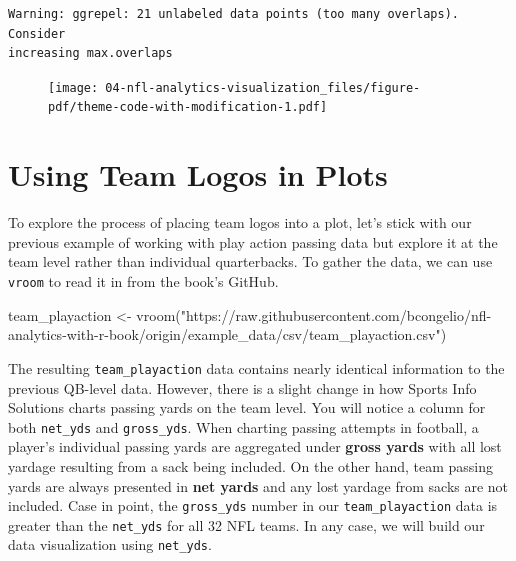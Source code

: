 \documentclass[
  letterpaper,
]{krantz}
\newenvironment{Shaded}{\begin{snugshade}}{\end{snugshade}}
\newcommand{\FunctionTok}[1]{\textcolor[rgb]{0.28,0.35,0.67}{#1}}
\newcommand{\NormalTok}[1]{\textcolor[rgb]{0.00,0.23,0.31}{#1}}
\newcommand{\OtherTok}[1]{\textcolor[rgb]{0.00,0.23,0.31}{#1}}
\newcommand{\StringTok}[1]{\textcolor[rgb]{0.13,0.47,0.30}{#1}}
\begin{document}
\begin{verbatim}
Warning: ggrepel: 21 unlabeled data points (too many overlaps). Consider
increasing max.overlaps
\end{verbatim}

\begin{figure}[H]

{\centering \texttt{[image: 04-nfl-analytics-visualization\_files/figure-pdf/theme-code-with-modification-1.pdf]}

}

\end{figure}

\hypertarget{using-team-logos-in-plots}{%
\section{Using Team Logos in Plots}\label{using-team-logos-in-plots}}

To explore the process of placing team logos into a plot, let's stick
with our previous example of working with play action passing data but
explore it at the team level rather than individual quarterbacks. To
gather the data, we can use \texttt{vroom} to read it in from the book's
GitHub.

\begin{Shaded}
\begin{Highlighting}[]
\NormalTok{team\_playaction }\OtherTok{\textless{}{-}}
  \FunctionTok{vroom}\NormalTok{(}\StringTok{"https://raw.githubusercontent.com/bcongelio/nfl{-}analytics{-}with{-}r{-}book/origin/example\_data/csv/team\_playaction.csv"}\NormalTok{)}
\end{Highlighting}
\end{Shaded}

The resulting \texttt{team\_playaction} data contains nearly identical
information to the previous QB-level data. However, there is a slight
change in how Sports Info Solutions charts passing yards on the team
level. You will notice a column for both \texttt{net\_yds} and
\texttt{gross\_yds}. When charting passing attempts in football, a
player's individual passing yards are aggregated under \textbf{gross
yards} with all lost yardage resulting from a sack being included. On
the other hand, team passing yards are always presented in \textbf{net
yards} and any lost yardage from sacks are not included. Case in point,
the \texttt{gross\_yds} number in our \texttt{team\_playaction} data is
greater than the \texttt{net\_yds} for all 32 NFL teams. In any case, we
will build our data visualization using \texttt{net\_yds}.
\end{document}
